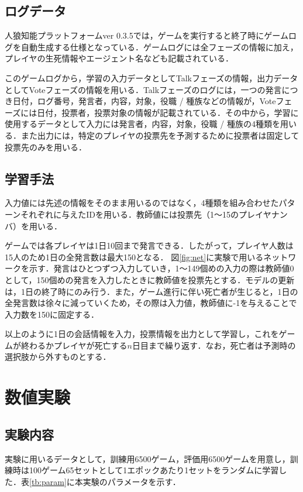 \documentclass{jarticle}
\begin{document}
\subsection{ログデータ}
人狼知能プラットフォームver 0.3.5では，ゲームを実行すると終了時にゲームログを自動生成する仕様となっている．ゲームログには全フェーズの情報に加え，プレイヤの生死情報やエージェント名なども記載されている．\par
このゲームログから，学習の入力データとしてTalkフェーズの情報，出力データとしてVoteフェーズの情報を用いる．Talkフェーズのログには，一つの発言につき日付，ログ番号，発言者，内容，対象，役職 / 種族などの情報が，Voteフェーズには日付，投票者，投票対象の情報が記載されている．その中から，学習に使用するデータとして入力には発言者，内容，対象，役職 / 種族の4種類を用いる．また出力には，特定のプレイヤの投票先を予測するために投票者は固定して投票先のみを用いる．

\subsection{学習手法}
入力値には先述の情報をそのまま用いるのではなく，4種類を組み合わせたパターンそれぞれに与えたIDを用いる．教師値には投票先（1～15のプレイヤナンバ）を用いる．\par
ゲームでは各プレイヤは1日10回まで発言できる．したがって，プレイヤ人数は15人のため1日の全発言数は最大150となる．
図\ref{fig:net}に実験で用いるネットワークを示す．発言はひとつずつ入力していき，1～149個めの入力の際は教師値0として，150個めの発言を入力したときに教師値を投票先とする．モデルの更新は，1日の終了時にのみ行う．また，ゲーム進行に伴い死亡者が生じると，1日の全発言数は徐々に減っていくため，その際は入力値，教師値に-1を与えることで入力数を150に固定する．\par
以上のように1日の会話情報を入力，投票情報を出力として学習し，これをゲームが終わるかプレイヤが死亡する$n$日目まで繰り返す．なお，死亡者は予測時の選択肢から外すものとする．

\section{数値実験}
\subsection{実験内容}
実験に用いるデータとして，訓練用6500ゲーム，評価用6500ゲームを用意し，訓練時は100ゲーム65セットとして1エポックあたり1セットをランダムに学習した．表\ref{tb:param}に本実験のパラメータを示す．\par
\end{document}
